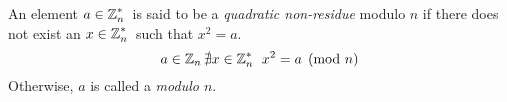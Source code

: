 \begin{definition}\label{def:Quadratic_Non_Residue}
  An element $a \in \operatorname{\mathbb{Z}}_{n}^{*}{}$ is said to be a \emph{quadratic non-residue} modulo $n$ if there does not exist an $x \in \operatorname{\mathbb{Z}}_{n}^{*}{}$ such that $x^{2} = a$.
  \begin{equation*}
    a \in \operatorname{\mathbb{Z}}_{n}{} \nexists x \in \operatorname{\mathbb{Z}}_{n}^{*}{}\:\: x^{2} = a \pmod{n}
  \end{equation*}
  Otherwise, $a$ is called a \emph{ modulo $n$}.
\end{definition}

